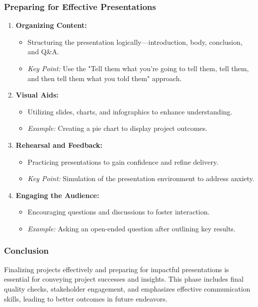\documentclass{beamer}
\begin{document}
\begin{frame}[fragile]
    \frametitle{Preparing for Effective Presentations}
    \begin{enumerate}
        \item \textbf{Organizing Content:}
            \begin{itemize}
                \item Structuring the presentation logically—introduction, body, conclusion, and Q\&A.
                \item \textit{Key Point:} Use the "Tell them what you’re going to tell them, tell them, and then tell them what you told them" approach.
            \end{itemize}
        
        \item \textbf{Visual Aids:}
            \begin{itemize}
                \item Utilizing slides, charts, and infographics to enhance understanding.
                \item \textit{Example:} Creating a pie chart to display project outcomes.
            \end{itemize}
        
        \item \textbf{Rehearsal and Feedback:}
            \begin{itemize}
                \item Practicing presentations to gain confidence and refine delivery.
                \item \textit{Key Point:} Simulation of the presentation environment to address anxiety.
            \end{itemize}
        
        \item \textbf{Engaging the Audience:}
            \begin{itemize}
                \item Encouraging questions and discussions to foster interaction.
                \item \textit{Example:} Asking an open-ended question after outlining key results.
            \end{itemize}
    \end{enumerate}
\end{frame}

\begin{frame}[fragile]
    \frametitle{Conclusion}
    Finalizing projects effectively and preparing for impactful presentations is essential for conveying project successes and insights. This phase includes final quality checks, stakeholder engagement, and emphasizes effective communication skills, leading to better outcomes in future endeavors.
\end{frame}
\end{document}
